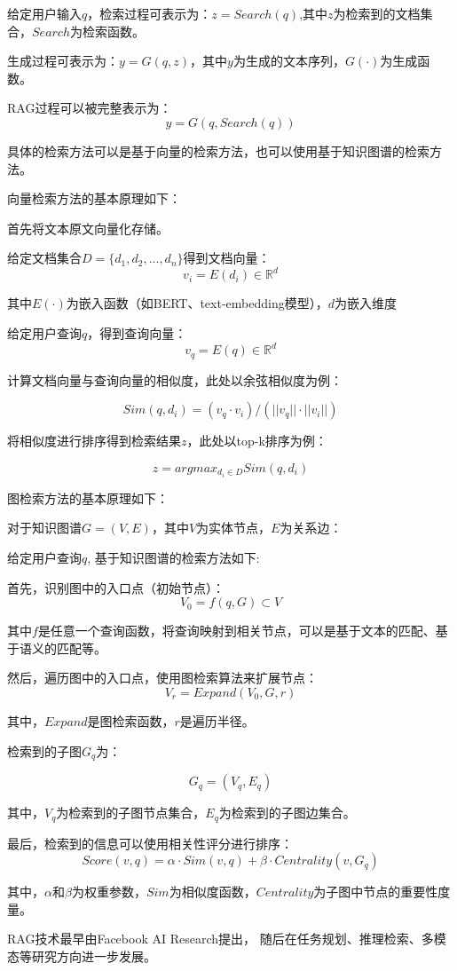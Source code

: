 \documentclass{xmu}
\begin{document}
给定用户输入$q$，检索过程可表示为：$z = Search(q)$,其中$z$为检索到的文档集合，$Search$为检索函数。

生成过程可表示为：$y = G(q,z)$，其中$y$为生成的文本序列，$G(·)$为生成函数。

RAG过程可以被完整表示为：
$$
y = G(q,Search(q))
$$

具体的检索方法可以是基于向量的检索方法，也可以使用基于知识图谱的检索方法。

向量检索方法的基本原理如下：

首先将文本原文向量化存储。

给定文档集合$D=\{d_1,d_2,...,d_n\}$得到文档向量：
$$
v_i = E(d_i) \in \mathbb{R}^d
$$

其中$E(·)$为嵌入函数（如BERT、text-embedding模型），$d$为嵌入维度

给定用户查询$q$，得到查询向量：
$$
v_q = E(q) \in \mathbb{R}^d
$$

计算文档向量与查询向量的相似度，此处以余弦相似度为例：

$$
Sim(q,d_i) = (v_q·v_i)/(||v_q||·||v_i||)
$$

将相似度进行排序得到检索结果$z$，此处以top-k排序为例：

$$
z = argmax_{d_i \in D} Sim(q,d_i)
$$

图检索方法的基本原理如下：

对于知识图谱$G=(V,E)$，其中$V$为实体节点，$E$为关系边：

给定用户查询$q$, 基于知识图谱的检索方法如下:

首先，识别图中的入口点（初始节点）：
$$
V_0 = f(q, G) \subset V
$$

其中$f$是任意一个查询函数，将查询映射到相关节点，可以是基于文本的匹配、基于语义的匹配等。

然后，遍历图中的入口点，使用图检索算法来扩展节点：
$$
V_r = Expand(V_0, G, r)
$$

其中，$Expand$是图检索函数，$r$是遍历半径。

检索到的子图$G_q$为：

$$
G_q = (V_q, E_q)
$$

其中，$V_q$为检索到的子图节点集合，$E_q$为检索到的子图边集合。

最后，检索到的信息可以使用相关性评分进行排序：
$$
Score(v, q) = \alpha \cdot Sim(v, q) + \beta \cdot Centrality(v, G_q)
$$

其中，$\alpha$和$\beta$为权重参数，$Sim$为相似度函数，$Centrality$为子图中节点的重要性度量。

RAG技术最早由Facebook AI Research提出，
随后在任务规划、推理检索、多模态等研究方向进一步发展。
\end{document}
